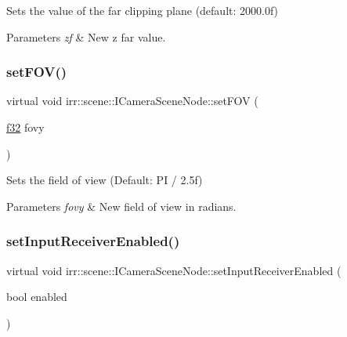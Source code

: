 Sets the value of the far clipping plane (default\+: 2000.\+0f) 


\begin{DoxyParams}{Parameters}
{\em zf} & New z far value. \\
\hline
\end{DoxyParams}
\mbox{\label{classirr_1_1scene_1_1ICameraSceneNode_a43ee11523e9cf842d4b5d8c6a572241c}} 
\subsubsection{\texorpdfstring{set\+F\+O\+V()}{setFOV()}}
{\footnotesize\ttfamily virtual void irr\+::scene\+::\+I\+Camera\+Scene\+Node\+::set\+F\+OV (\begin{DoxyParamCaption}\item[{\hyperlink{namespaceirr_a0277be98d67dc26ff93b1a6a1d086b07}{f32}}]{fovy }\end{DoxyParamCaption})\hspace{0.3cm}{\ttfamily [pure virtual]}}



Sets the field of view (Default\+: PI / 2.\+5f) 


\begin{DoxyParams}{Parameters}
{\em fovy} & New field of view in radians. \\
\hline
\end{DoxyParams}
\mbox{\label{classirr_1_1scene_1_1ICameraSceneNode_a5b5c89233c1805676d6fcb392236dfec}} 
\subsubsection{\texorpdfstring{set\+Input\+Receiver\+Enabled()}{setInputReceiverEnabled()}}
{\footnotesize\ttfamily virtual void irr\+::scene\+::\+I\+Camera\+Scene\+Node\+::set\+Input\+Receiver\+Enabled (\begin{DoxyParamCaption}\item[{bool}]{enabled }\end{DoxyParamCaption})\hspace{0.3cm}{\ttfamily [pure virtual]}}



